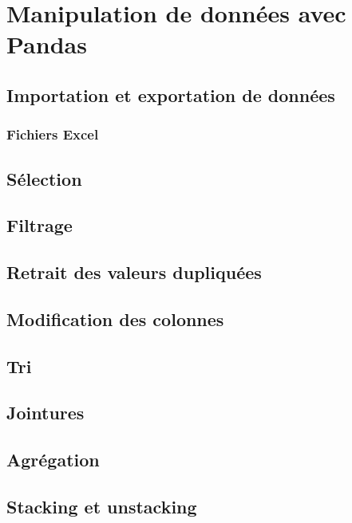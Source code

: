 \documentclass[12pt,]{book}
\numberwithin{equation}{section}
\numberwithin{countremarque}{section}
\begin{document}
\chapter{Manipulation de données avec Pandas}\label{pandas}

\section{Importation et exportation de
données}\label{importation-et-exportation-de-donnees}

\subsection{Fichiers Excel}\label{pandas-importation-excel}

\section{Sélection}\label{selection}

\section{Filtrage}\label{filtrage}

\section{Retrait des valeurs
dupliquées}\label{retrait-des-valeurs-dupliquees}

\section{Modification des colonnes}\label{modification-des-colonnes}

\section{Tri}\label{tri-2}

\section{Jointures}\label{jointures}

\section{Agrégation}\label{agregation}

\section{Stacking et unstacking}\label{stacking-et-unstacking}
\end{document}
